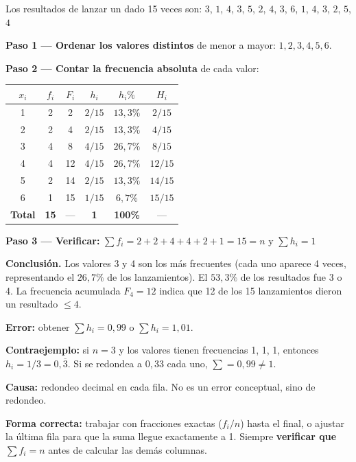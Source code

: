 \documentclass[11pt, letterpaper]{article}
\begin{document}
\begin{tcolorbox}[examplebox, title={Ej. 3. Construir una tabla de frecuencias para datos no agrupados}]
Los resultados de lanzar un dado 15 veces son:
$3$, $1$, $4$, $3$, $5$, $2$, $4$, $3$, $6$, $1$, $4$, $3$, $2$, $5$, $4$

\textbf{Paso 1 --- Ordenar los valores distintos} de menor a mayor: $1, 2, 3, 4, 5, 6$.
\medskip

\textbf{Paso 2 --- Contar la frecuencia absoluta} de cada valor:
  \begin{center}
  \renewcommand{\arraystretch}{1.3}
  \begin{tabular}{c c c c c c}
  \toprule
  $x_i$ & $f_i$ & $F_i$ & $h_i$ & $h_i\%$ & $H_i$\\
  \midrule
  1 & 2 & 2  & $2/15$ & $13{,}3\%$ & $2/15$\\
  2 & 2 & 4  & $2/15$ & $13{,}3\%$ & $4/15$\\
  3 & 4 & 8  & $4/15$ & $26{,}7\%$ & $8/15$\\
  4 & 4 & 12 & $4/15$ & $26{,}7\%$ & $12/15$\\
  5 & 2 & 14 & $2/15$ & $13{,}3\%$ & $14/15$\\
  6 & 1 & 15 & $1/15$ & $6{,}7\%$  & $15/15$\\
  \midrule
  \textbf{Total} & \textbf{15} & --- & \textbf{1} & \textbf{100\%} & ---\\
  \bottomrule
  \end{tabular}
  \end{center}
\medskip

\textbf{Paso 3 --- Verificar:} $\sum f_i = 2+2+4+4+2+1 = 15 = n$ \checkmark \quad y \quad $\sum h_i = 1$ \checkmark
\medskip

\noindent\textbf{Conclusión.} Los valores 3 y 4 son los más frecuentes (cada uno aparece 4 veces, representando el $26{,}7\%$ de los lanzamientos). El $53{,}3\%$ de los resultados fue 3 o 4. La frecuencia acumulada $F_4 = 12$ indica que 12 de los 15 lanzamientos dieron un resultado $\leq 4$.

\end{tcolorbox}

\begin{tcolorbox}[warningbox, title={Error frecuente: frecuencias relativas que no suman exactamente 1}]
\textbf{Error:} obtener $\sum h_i = 0{,}99$ o $\sum h_i = 1{,}01$.

\medskip

\textbf{Contraejemplo:} si $n=3$ y los valores tienen frecuencias 1, 1, 1, entonces $h_i = 1/3 = 0{,}\overline{3}$. Si se redondea a $0{,}33$ cada uno, $\sum = 0{,}99 \neq 1$.

\medskip

\textbf{Causa:} redondeo decimal en cada fila. No es un error conceptual, sino de redondeo.

\medskip

\textbf{Forma correcta:} trabajar con fracciones exactas ($f_i/n$) hasta el final, o ajustar la última fila para que la suma llegue exactamente a 1. Siempre \textbf{verificar que $\sum f_i = n$} antes de calcular las demás columnas.
\end{tcolorbox}
\end{document}
